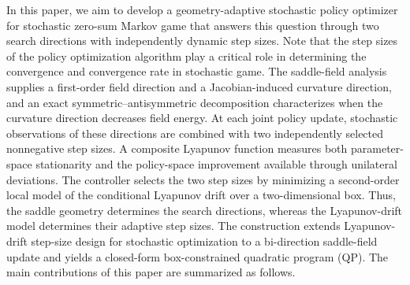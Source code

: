 \documentclass[journal]{IEEEtran}
\theoremstyle{remark}
\begin{document}
	In this paper, we aim to develop a geometry-adaptive stochastic policy optimizer for stochastic zero-sum Markov game that answers this question through two search directions with independently dynamic step sizes.
	Note that the step sizes of the policy optimization algorithm play a critical role in determining the convergence and convergence rate in stochastic game.
	The saddle-field analysis supplies a first-order field direction and a Jacobian-induced curvature direction, and an exact symmetric--antisymmetric decomposition characterizes when the curvature direction decreases field energy.
	At each joint policy update, stochastic observations of these directions are combined with two independently selected nonnegative step sizes.
	A composite Lyapunov function measures both parameter-space stationarity and the policy-space improvement available through unilateral deviations.
	The controller selects the two step sizes by minimizing a second-order local model of the conditional Lyapunov drift over a two-dimensional box.
	Thus, the saddle geometry determines the search directions, whereas the Lyapunov-drift model determines their adaptive step sizes.
	The construction extends Lyapunov-drift step-size design for stochastic optimization \cite{Zhang2025AdaptivePolyak,Yuan2025StepSizeSDE} to a bi-direction saddle-field update and yields a closed-form box-constrained quadratic program (QP).
	The main contributions of this paper are summarized as follows.
\end{document}
